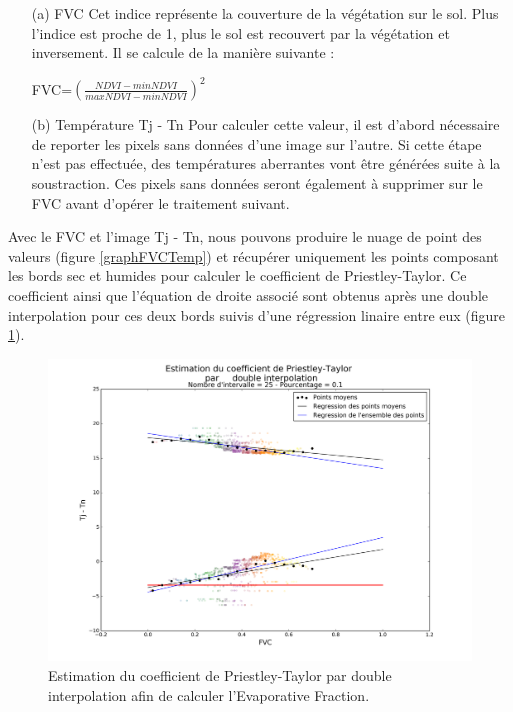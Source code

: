\documentclass[10pt,a4paper]{article}
\begin{document}
\begin{enumerate}
\item[(a)]FVC \medbreak
Cet indice représente la couverture de la végétation sur le sol. Plus l'indice est proche de 1, plus le sol est recouvert par la végétation et inversement. Il se calcule de la manière suivante :
\begin{center}
\textrm{FVC}=$ (\frac{NDVI-minNDVI}{maxNDVI-minNDVI})^2 $
\end{center}\smallbreak

\item[(b)]Température Tj - Tn \medbreak
Pour calculer cette valeur, il est d'abord nécessaire de reporter les pixels sans données d'une image sur l'autre. Si cette étape n'est pas effectuée, des températures aberrantes vont être générées suite à la soustraction. Ces pixels sans données seront également à supprimer sur le FVC avant d'opérer le traitement suivant.
\end{enumerate}

Avec le FVC et l'image Tj - Tn, nous pouvons produire le nuage de point des valeurs (figure \ref{graphFVCTemp}) et récupérer uniquement les points composant les bords sec et humides pour calculer le coefficient de Priestley-Taylor. Ce coefficient ainsi que l'équation de droite associé sont obtenus après une double interpolation pour ces deux bords suivis d'une régression linaire entre eux (figure \ref{graphPriestley}).

\begin{figure}[!h]
\centering
\includegraphics[scale=0.35]{img/graph_priestley.png}
\caption{Estimation du coefficient de Priestley-Taylor par double interpolation afin de calculer l'Evaporative Fraction.}
\label{graphPriestley}
\end{figure}
\end{document}
